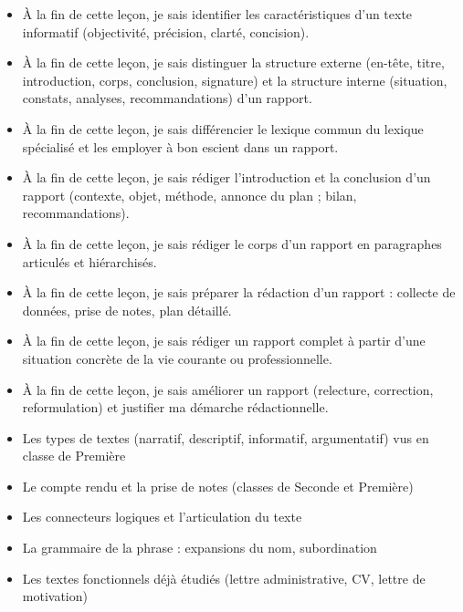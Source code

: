 \documentclass[11pt]{article}
\begin{document}
\begin{objectifs}
\begin{itemize}
\item À la fin de cette leçon, je sais identifier les caractéristiques d'un texte informatif (objectivité, précision, clarté, concision).
\item À la fin de cette leçon, je sais distinguer la structure externe (en-tête, titre, introduction, corps, conclusion, signature) et la structure interne (situation, constats, analyses, recommandations) d'un rapport.
\item À la fin de cette leçon, je sais différencier le lexique commun du lexique spécialisé et les employer à bon escient dans un rapport.
\item À la fin de cette leçon, je sais rédiger l'introduction et la conclusion d'un rapport (contexte, objet, méthode, annonce du plan ; bilan, recommandations).
\item À la fin de cette leçon, je sais rédiger le corps d'un rapport en paragraphes articulés et hiérarchisés.
\item À la fin de cette leçon, je sais préparer la rédaction d'un rapport : collecte de données, prise de notes, plan détaillé.
\item À la fin de cette leçon, je sais rédiger un rapport complet à partir d'une situation concrète de la vie courante ou professionnelle.
\item À la fin de cette leçon, je sais améliorer un rapport (relecture, correction, reformulation) et justifier ma démarche rédactionnelle.
\end{itemize}
\end{objectifs}

\begin{prerequis}
\begin{itemize}
\item Les types de textes (narratif, descriptif, informatif, argumentatif) vus en classe de Première
\item Le compte rendu et la prise de notes (classes de Seconde et Première)
\item Les connecteurs logiques et l'articulation du texte
\item La grammaire de la phrase : expansions du nom, subordination
\item Les textes fonctionnels déjà étudiés (lettre administrative, CV, lettre de motivation)
\end{itemize}
\end{prerequis}
\end{document}
